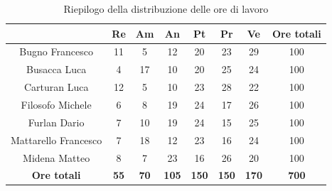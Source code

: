 \begin{table}[H]
  \centering
  \renewcommand{\arraystretch}{1.8}
  \begin{tabular}{c|c|c|c|c|c|c|c}
    \rowcolor[HTML]{125E28}
    \multicolumn{1}{c}{\color[HTML]{FFFFFF}\textbf{ Nominativo }}
                         & \multicolumn{1}{c}{\color[HTML]{FFFFFF}\textbf{ Re }}
                         & \multicolumn{1}{c}{\color[HTML]{FFFFFF}\textbf{ Am}}
                         & \multicolumn{1}{c}{\color[HTML]{FFFFFF}\textbf{ An }}
                         & \multicolumn{1}{c}{\color[HTML]{FFFFFF}\textbf{ Pt }}
                         & \multicolumn{1}{c}{\color[HTML]{FFFFFF}\textbf{ Pr }}
                         & \multicolumn{1}{c}{\color[HTML]{FFFFFF}\textbf{ Ve }}
                         & \multicolumn{1}{c}{\color[HTML]{FFFFFF}\textbf{ Ore totali }}                                                                                          \\
    \hline
    Bugno Francesco      & 11                                                            & 5           & 12           & 20           & 23           & 29           & 100          \\
    Busacca Luca         & 4                                                             & 17          & 10           & 20           & 25           & 24           & 100          \\
    Carturan Luca        & 12                                                            & 5           & 10           & 23           & 28           & 22           & 100          \\
    Filosofo Michele     & 6                                                             & 8           & 19           & 24           & 17           & 26           & 100          \\
    Furlan Dario         & 7                                                             & 10          & 19           & 24           & 15           & 25           & 100          \\
    Mattarello Francesco & 7                                                             & 18          & 12           & 23           & 16           & 24           & 100          \\
    Midena Matteo        & 8                                                             & 7           & 23           & 16           & 26           & 20           & 100          \\
    \textbf{Ore totali}  & \textbf{55}                                                   & \textbf{70} & \textbf{105} & \textbf{150} & \textbf{150} & \textbf{170} & \textbf{700}
  \end{tabular}
  \caption{Riepilogo della distribuzione delle ore di lavoro}
\end{table}

